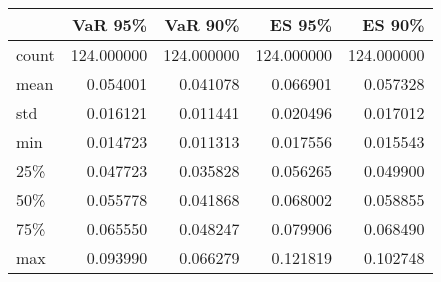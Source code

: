 \begin{tabular}{lrrrr}
\toprule
{} &     VaR 95\% &     VaR 90\% &      ES 95\% &      ES 90\% \\
\midrule
count &  124.000000 &  124.000000 &  124.000000 &  124.000000 \\
mean  &    0.054001 &    0.041078 &    0.066901 &    0.057328 \\
std   &    0.016121 &    0.011441 &    0.020496 &    0.017012 \\
min   &    0.014723 &    0.011313 &    0.017556 &    0.015543 \\
25\%   &    0.047723 &    0.035828 &    0.056265 &    0.049900 \\
50\%   &    0.055778 &    0.041868 &    0.068002 &    0.058855 \\
75\%   &    0.065550 &    0.048247 &    0.079906 &    0.068490 \\
max   &    0.093990 &    0.066279 &    0.121819 &    0.102748 \\
\bottomrule
\end{tabular}
